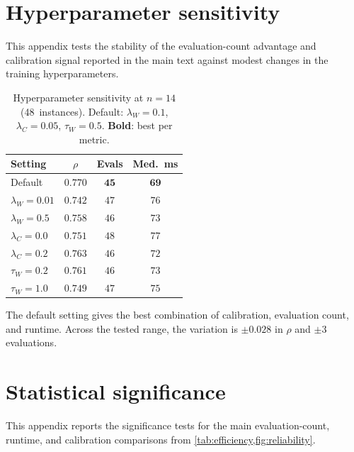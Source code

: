 \documentclass[aps,prx,reprint,superscriptaddress,longbibliography]{revtex4-2}
\begin{document}
\section{Hyperparameter sensitivity}
\label{app:sensitivity}

This appendix tests the stability of the evaluation-count advantage and
calibration signal reported in the main text against modest changes in
the training hyperparameters.

\begin{table}[h]
\caption{Hyperparameter sensitivity at $n{=}14$ (48~instances). Default: $\lambda_W{=}0.1$, $\lambda_C{=}0.05$, $\tau_W{=}0.5$. \textbf{Bold}: best per metric.
\label{tab:sensitivity}}
\begin{ruledtabular}
\begin{tabular}{lccc}
    Setting & $\rho$ & Evals
    & Med.\ ms \\
    \hline
    Default & $\mathbf{0.770}$ & $\mathbf{45}$ & $\mathbf{69}$ \\
    $\lambda_W = 0.01$ & $0.742$ & $47$ & $76$ \\
    $\lambda_W = 0.5$  & $0.758$ & $46$ & $73$ \\
    $\lambda_C = 0.0$  & $0.751$ & $48$ & $77$ \\
    $\lambda_C = 0.2$  & $0.763$ & $46$ & $72$ \\
    $\tau_W = 0.2$     & $0.761$ & $46$ & $73$ \\
    $\tau_W = 1.0$     & $0.749$ & $47$ & $75$ \\
\end{tabular}
\end{ruledtabular}
\end{table}

The default setting gives the best combination of calibration,
evaluation count, and runtime. Across the tested range, the variation
is $\pm 0.028$ in $\rho$ and $\pm 3$ evaluations.

\section{Statistical significance}
\label{app:significance}

This appendix reports the significance tests for the main evaluation-count,
runtime, and calibration comparisons from \cref{tab:efficiency,fig:reliability}.
\end{document}
